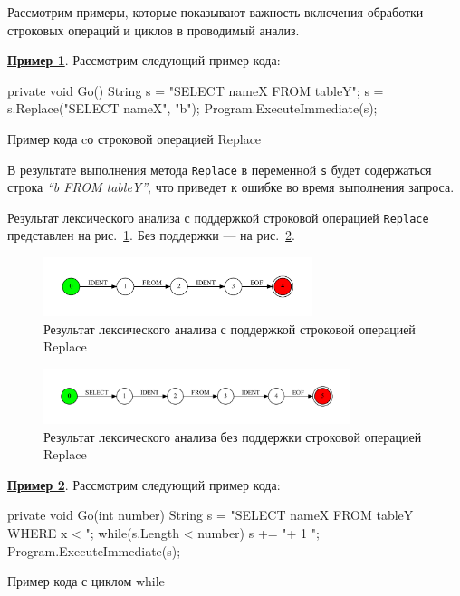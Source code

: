 \documentclass{matmex-diploma}
\begin{document}
Рассмотрим примеры, которые показывают важность включения обработки строковых операций и циклов в проводимый анализ.  

\textbf{\underline{Пример 1}}. 
Рассмотрим следующий пример кода:
\begin{listing}[H]
    \begin{pyglist}[language=csharp,numbers=left,numbersep=5pt]
 private void Go(){
   String s = "SELECT nameX FROM tableY";
   s = s.Replace("SELECT nameX", "b");
   Program.ExecuteImmediate(s);
 }
    \end{pyglist}
\caption{Пример кода cо строковой операцией Replace}
\label{lst:example}
\end{listing}

В результате выполнения метода \verb|Replace| в переменной \verb|s| будет содержаться строка \textit{``b FROM tableY''}, что приведет к ошибке во время выполнения запроса. 

Результат лексического анализа с поддержкой строковой операцией \verb|Replace| представлен на рис.~\ref{fig:replace_ex_1}. Без поддержки --- на рис.~\ref{fig:replace_ex}.  

\begin{figure}[h!]
\begin{center}
\includegraphics[width=0.7\textwidth]{ReplaceEx}
\caption{Результат лексического анализа с поддержкой строковой операцией Replace}
\label{fig:replace_ex_1} 
\end{center}
\end{figure}

\begin{figure}[h!]
\begin{center}
\includegraphics[width=0.8\textwidth]{ReplaceEx1}
\caption{Результат лексического анализа без поддержки строковой операцией Replace}
\label{fig:replace_ex} 
\end{center}
\end{figure}

\newpage
\textbf{\underline{Пример 2}}. 
Рассмотрим следующий пример кода:
\begin{listing}[H]
    \begin{pyglist}[language=csharp,numbers=left,numbersep=5pt]
 private void Go(int number){
   String s = "SELECT nameX FROM tableY WHERE x < ";
   while(s.Length < number){ s += "+ 1 ";}
   Program.ExecuteImmediate(s);
 }
    \end{pyglist}
\caption{Пример кода с циклом while}
\label{lst:example}
\end{listing}
\end{document}
